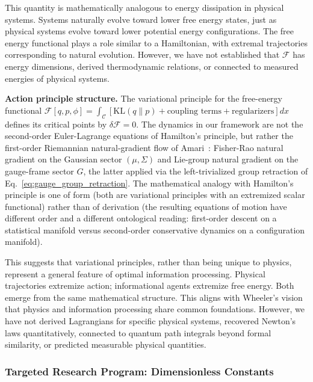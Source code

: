 \documentclass[11pt]{article}
\begin{document}
This quantity is mathematically analogous to energy dissipation in physical systems. Systems naturally evolve toward lower free energy states, just as physical systems evolve toward lower potential energy configurations. The free energy functional plays a role similar to a Hamiltonian, with extremal trajectories corresponding to natural evolution. However, we have not established that $\mathcal{F}$ has energy dimensions, derived thermodynamic relations, or connected to measured energies of physical systems.

\textbf{Action principle structure.} The variational principle for the free-energy functional $\mathcal{F}[q,p,\phi] = \int_{\mathcal{C}} [\mathrm{KL}(q \| p) + \text{coupling terms} + \text{regularizers}] dx$ defines its critical points by $\delta \mathcal{F} = 0$. The dynamics in our framework are not the second-order Euler-Lagrange equations of Hamilton's principle, but rather the first-order Riemannian natural-gradient flow of Amari~\cite{Amari1998}: Fisher-Rao natural gradient on the Gaussian sector $(\mu, \Sigma)$ and Lie-group natural gradient on the gauge-frame sector $G$, the latter applied via the left-trivialized group retraction of Eq.~\ref{eq:gauge_group_retraction}. The mathematical analogy with Hamilton's principle is one of form (both are variational principles with an extremized scalar functional) rather than of derivation (the resulting equations of motion have different order and a different ontological reading: first-order descent on a statistical manifold versus second-order conservative dynamics on a configuration manifold).

This suggests that variational principles, rather than being unique to physics, represent a general feature of optimal information processing. Physical trajectories extremize action; informational agents extremize free energy. Both emerge from the same mathematical structure. This aligns with Wheeler's vision that physics and information processing share common foundations. However, we have not derived Lagrangians for specific physical systems, recovered Newton's laws quantitatively, connected to quantum path integrals beyond formal similarity, or predicted measurable physical quantities.

\subsubsection{Targeted Research Program: Dimensionless Constants}
\label{sec:dimensionless_constants_program}
\end{document}
